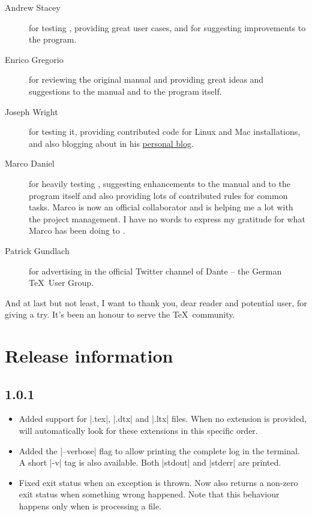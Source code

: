 \documentclass[a4paper,twoside,12pt]{memoir}
\begin{document}
\begin{description}
\item[Andrew Stacey] for testing \arara, providing great user cases, and for 
                     suggesting improvements to the program.
\item[Enrico Gregorio] for reviewing the original manual and providing great 
                       ideas and suggestions to the manual and to the program 
                       itself.
\item[Joseph Wright] for testing it, providing contributed code for Linux and Mac
                     installations, and also blogging about \arara in his 
                     \href{http://www.texdev.net}{personal blog}.
\item[Marco Daniel] for heavily testing \arara, suggesting enhancements to the 
                    manual and to the program itself and also providing lots of 
                    contributed rules for common tasks. Marco is now an official
                    collaborator and is helping me a lot with the project
                    management. I have no words to express my gratitude for what
                    Marco has been doing to \arara.
\item[Patrick Gundlach] for advertising \arara in the official Twitter channel 
                        of Dante -- the German \TeX\ User Group.
\end{description}

And at last but not least, I want to thank you, dear reader and potential user, for giving \arara a try. It's been an honour to serve the \TeX\ community.

\cleardoublepage

\section*{Release information}

\subsection*{1.0.1}

\begin{itemize}
\item[\featurenew] Added support for |.tex|, |.dtx| and |.ltx| files. When no extension is provided, \arara will automatically look for these extensions in this specific order.
\item[\featurenew] Added the |--verbose| flag to allow printing the complete log in the terminal. A short |-v| tag is also available. Both |stdout| and |stderr| are printed.
\item[\featurefixed] Fixed exit status when an exception is thrown. Now \arara also returns a non-zero exit status when something wrong happened. Note that this behaviour happens only when \arara is processing a file.
\end{itemize}
\end{document}

